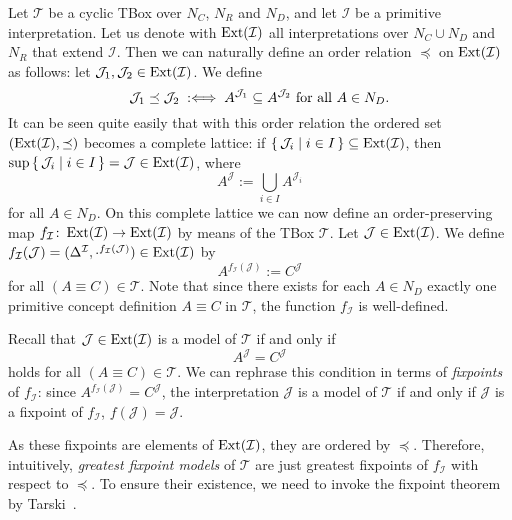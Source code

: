 Let $\mathcal{T}$ be a cyclic TBox over $N_C$, $N_R$ and $N_D$, and let $\mathcal{I}$ be a
primitive interpretation.  Let us denote with $\operatorname{Ext}(\mathcal{I})$ all interpretations over
$N_C \cup N_D$ and $N_R$ that extend $\mathcal{I}$.  Then we can naturally define an order
relation $\preceq$ on $\operatorname{Ext}(\mathcal{I})$ as follows: let $\mathcal{J}_1, \mathcal{J}_2
\in \operatorname{Ext}(\mathcal{I})$.  We define
\begin{equation*}
  \mathcal{J}_1 \preceq \mathcal{J}_2 \;:\Longleftrightarrow\; A^{\mathcal{J}_1} \subseteq A^{\mathcal{J}_2}
  \text{ for all } A \in N_D.
\end{equation*}
It can be seen quite easily that with this order relation the ordered set
$(\operatorname{Ext}(\mathcal{I}), \preceq)$ becomes a complete lattice: if ${\{\, \mathcal{J}_i \mid i
  \in I \,\}} \subseteq \operatorname{Ext}(\mathcal{I})$, then $\sup {\ensuremath{\{\, \mathcal{J}_i \mid i \in I \,\}}} =
\mathcal{J} \in \operatorname{Ext}(\mathcal{I})$, where
\begin{equation*}
  A^{\mathcal{J}} := \bigcup_{i \in I} A^{\mathcal{J}_i}
\end{equation*}
for all $A \in N_D$.  On this complete lattice we can now define an order-preserving map
$f_{\mathcal{I}} \colon \operatorname{Ext}(\mathcal{I}) \to \operatorname{Ext}(\mathcal{I})$ by means of the TBox
$\mathcal{T}$.  Let $\mathcal{J} \in \operatorname{Ext}(\mathcal{I})$.  We define
$f_{\mathcal{I}}(\mathcal{J}) = (\Delta^{\mathcal{I}},
\cdot^{f_{\mathcal{I}}(\mathcal{J})}) \in \operatorname{Ext}(\mathcal{I})$ by
\begin{equation*}
  A^{f_{\mathcal{I}}(\mathcal{J})} := C^{\mathcal{J}}
\end{equation*}
for all $(A \equiv C) \in \mathcal{T}$.  Note that since there exists for each $A \in N_D$
exactly one primitive concept definition $A \equiv C$ in $\mathcal{T}$, the function
$f_{\mathcal{I}}$ is well-defined.

Recall that $\mathcal{J} \in \operatorname{Ext}(\mathcal{I})$ is a model of $\mathcal{T}$ if and only if
\begin{equation*}
  A^{\mathcal{J}} = C^{\mathcal{J}}
\end{equation*}
holds for all $(A \equiv C) \in \mathcal{T}$.  We can rephrase this condition in terms of
\emph{fixpoints} of $f_{\mathcal{I}}$: since $A^{f_{\mathcal{I}}(\mathcal{J})} =
C^{\mathcal{J}}$, the interpretation $\mathcal{J}$ is a model of $\mathcal{T}$ if and only
if $\mathcal{J}$ is a fixpoint of $f_{\mathcal{I}}$, \ie $f(\mathcal{J}) = \mathcal{J}$.

As these fixpoints are elements of $\operatorname{Ext}(\mathcal{I})$, they are ordered by $\preceq$.
Therefore, intuitively, \emph{greatest fixpoint models} of $\mathcal{T}$ are just greatest
fixpoints of $f_{\mathcal{I}}$ with respect to $\preceq$.  To ensure their existence, we
need to invoke the fixpoint theorem by Tarski~\cite{Tarski-Fixpoint-Theorem}.

